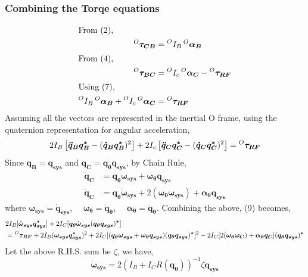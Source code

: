 \subsubsection{Combining the Torqe equations}
\begin{align*}
  \shortintertext{From (2),}
  \prescript{O}{}{\bm{\tau_{CB}}} &= \prescript{O}{}{I_B} \prescript{O}{}{\bm{\alpha_B}} \\
  \shortintertext{From (4),}
  \prescript{O}{}{\bm{\tau_{BC}}} &= \prescript{O}{}{I_c} \prescript{O}{}{\bm{\alpha_C}} - \prescript{O}{}{\bm{\tau_{RF}}}  \\
  \shortintertext{Using (7),}
  \prescript{O}{}{I_B} \prescript{O}{}{\bm{\alpha_B}} + \prescript{O}{}{I_c} \prescript{O}{}{\bm{\alpha_C}} &= \prescript{O}{}{\bm{\tau_{RF}}} \\
\end{align*}  
Assuming all the vectors are represented in the inertial O frame, using the quaternion representation for angular acceleration,
\begin{equation}
  2I_B \left[\bm{\ddot{q}_B}\bm{q_B^*} - (\bm{\dot{q}_B} \bm{q_B^*})^2\right] + 2I_c \left[\bm{\ddot{q}_C}\bm{q_C^*} - (\bm{\dot{q}_C} \bm{q_C^*})^2\right] = \prescript{O}{}{\bm{\tau_{RF}}}
\end{equation}
Since $\bm{q_B} = \bm{q_{sys}}$ and $\bm{q_C} = \bm{q_{\theta}q_{sys}}$, by Chain Rule,
\begin{align*}
  \bm{\dot{q}_C} &= \bm{q_\theta} \bm{\omega_{sys}} + \bm{\omega_\theta}\bm{q_{sys}} \\
  \bm{\ddot{q}_C} &= \bm{q_\theta} \bm{\dot{\omega}_{sys}} + 2(\bm{\omega_\theta \omega_{sys}}) + \bm{\alpha_\theta}\bm{q_{sys}}
\end{align*}
where $\bm{\omega_{sys}} = \bm{\dot{q}_{sys}}$, $\quad\bm{\omega_{\theta}} = \bm{\dot{q}_{\theta}}$, $\quad \bm{\alpha_{\theta}} = \bm{\ddot{q}_{\theta}}$.
Combining the above, (9) becomes,
\begin{align*}
  &2I_B[\bm{\dot{\omega}_{sys}} \bm{q_{sys}^*}] + 2I_C[\bm{q_\theta}\bm{\dot{\omega}_{sys}} (\bm{q_\theta}\bm{q_{sys}})^{\bm{*}}] \\
  &= \prescript{O}{}{\bm{\tau_{RF}}} + 2I_B(\bm{\omega_{sys}}\bm{q_{sys}^*})^2 + 2I_C[(\bm{q_\theta} \bm{\omega_{sys}} + \bm{\omega_\theta}\bm{q_{sys}})(\bm{q_{\theta}\bm{q_{sys}}})^{\bm{*}}]^2 - 2I_C[2(\bm{\omega_\theta \omega_C}) + \bm{\alpha_\theta} \bm{q_C}](\bm{q_\theta q_{sys}})^{\bm{*}} \\
\end{align*}
Let the above R.H.S. sum be $\zeta$, we have,
\begin{equation}
  \bm{\dot{\omega}_{sys}} = 2(I_B + I_CR(\bm{q_\theta}))^{-1} \zeta \bm{q_{sys}}
\end{equation}

